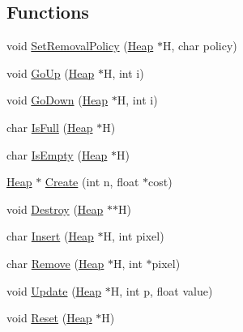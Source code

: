 \subsection*{Functions}
\begin{DoxyCompactItemize}
\item 
void \hyperlink{namespacegft_1_1Heap_a7b36154672ef70039ebded83a20451f3}{Set\-Removal\-Policy} (\hyperlink{namespacegft_1_1Heap_a0d90f0f86ac580f565de0c8e294ece4c}{Heap} $\ast$H, char policy)
\item 
void \hyperlink{namespacegft_1_1Heap_a749cb0fbc221c68015249884f905d8df}{Go\-Up} (\hyperlink{namespacegft_1_1Heap_a0d90f0f86ac580f565de0c8e294ece4c}{Heap} $\ast$H, int i)
\item 
void \hyperlink{namespacegft_1_1Heap_ad0c1c0c77a2a8ba1e3ffb07733244041}{Go\-Down} (\hyperlink{namespacegft_1_1Heap_a0d90f0f86ac580f565de0c8e294ece4c}{Heap} $\ast$H, int i)
\item 
char \hyperlink{namespacegft_1_1Heap_abff765913421a49ddc225dab176e0e63}{Is\-Full} (\hyperlink{namespacegft_1_1Heap_a0d90f0f86ac580f565de0c8e294ece4c}{Heap} $\ast$H)
\item 
char \hyperlink{namespacegft_1_1Heap_a2ff888b905d6d284dc027ea5ba8e8c1e}{Is\-Empty} (\hyperlink{namespacegft_1_1Heap_a0d90f0f86ac580f565de0c8e294ece4c}{Heap} $\ast$H)
\item 
\hyperlink{namespacegft_1_1Heap_a0d90f0f86ac580f565de0c8e294ece4c}{Heap} $\ast$ \hyperlink{namespacegft_1_1Heap_a1dea4d0b1f92c9b85597be84f41306a2}{Create} (int n, float $\ast$cost)
\item 
void \hyperlink{namespacegft_1_1Heap_a469ebad46a0e799ab1ea1ea2fba31085}{Destroy} (\hyperlink{namespacegft_1_1Heap_a0d90f0f86ac580f565de0c8e294ece4c}{Heap} $\ast$$\ast$H)
\item 
char \hyperlink{namespacegft_1_1Heap_afab84a90468ed4cfcce6a1ca7a731605}{Insert} (\hyperlink{namespacegft_1_1Heap_a0d90f0f86ac580f565de0c8e294ece4c}{Heap} $\ast$H, int pixel)
\item 
char \hyperlink{namespacegft_1_1Heap_a4f8f88a445d027dde579cf2c65ab02ac}{Remove} (\hyperlink{namespacegft_1_1Heap_a0d90f0f86ac580f565de0c8e294ece4c}{Heap} $\ast$H, int $\ast$pixel)
\item 
void \hyperlink{namespacegft_1_1Heap_a77db3ca066391ec1eea52a596aa43a64}{Update} (\hyperlink{namespacegft_1_1Heap_a0d90f0f86ac580f565de0c8e294ece4c}{Heap} $\ast$H, int p, float value)
\item 
void \hyperlink{namespacegft_1_1Heap_a44430a3dbf4fd4095f5f8e68929832d3}{Reset} (\hyperlink{namespacegft_1_1Heap_a0d90f0f86ac580f565de0c8e294ece4c}{Heap} $\ast$H)
\end{DoxyCompactItemize}



